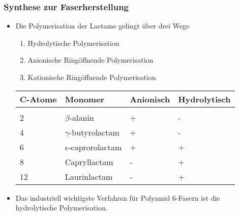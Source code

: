 \documentclass[10pt]{beamer}
\begin{document}
\begin{frame}[t] \frametitle{\small Synthese zur Faserherstellung \footnotemark}
\begin{itemize}
  \item \scriptsize Die Polymerisation der Lactame gelingt über drei Wege
  \begin{enumerate}
    \item \scriptsize Hydrolytische Polymerisation
    \item \scriptsize Anionische Ringöffnende Polymerisation
    \item \scriptsize Kationische Ringöffnende Polymerisation
  \end{enumerate}

 \begin{tabularx}{\textwidth}{XXXX}
 C-Atome & Monomer & Anionisch& Hydrolytisch \\
 \hline \\[1ex]
2& $\beta$-alanin & + & -\\[1ex]
4& $\gamma$-butyrolactam & + & -\\[1ex]
6& $\epsilon$-caprorolactam &+ & +\\[1ex]
8 & Capryllactam & -& + \\[1ex]
12 & Laurinlactam & - &+ \\
\end{tabularx}


  \item \scriptsize Das industriell wichtigste Verfahren für Polyamid 6-Fasern ist die hydrolytische Polymerisation.

\end{itemize}


\end{frame}
\end{document}
